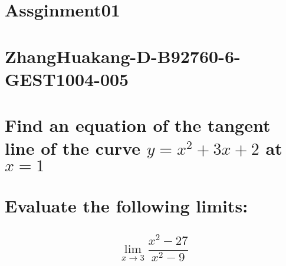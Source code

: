 \documentclass[5pt]{article}
\begin{document}
    \section*{Assginment01}
    \section*{ZhangHuakang-D-B92760-6-GEST1004-005}
    \section{Find an equation of the tangent line of the curve $y = x^2 +3x+2$ at $x = 1$}
    \section*{}
    \section*{}
    \section*{}
    \section*{}
    \section*{}
    \section{Evaluate the following limits:}
    \subsection{$${\lim_{x \to 3}}\frac{x^2 - 27}{x^2 -9}$$}
    \section*{}
    \section*{}
    \section*{} 
    \section*{}
\end{document}
